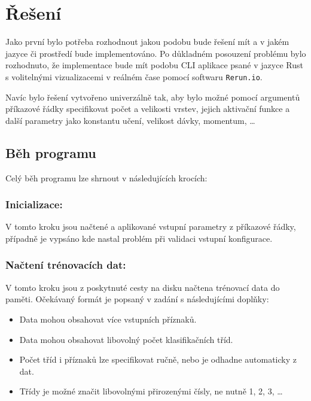 \section{Řešení}

Jako první bylo potřeba rozhodnout jakou podobu bude řešení mít a v jakém jazyce či prostředí bude implementováno.
Po důkladném posouzení problému bylo rozhodnuto, že implementace bude mít podobu CLI aplikace psané v jazyce Rust s volitelnými vizualizacemi v reálném čase pomocí softwaru \texttt{Rerun.io}.

Navíc bylo řešení vytvořeno univerzálně tak, aby bylo možné pomocí argumentů příkazové řádky specifikovat počet a velikosti vrstev, jejich aktivační funkce a další parametry jako konstantu učení, velikost dávky, momentum, \ldots

\subsection{Běh programu}
Celý běh programu lze shrnout v následujících krocích:
\subsubsection*{Inicializace:}
V tomto kroku jsou načtené a aplikované vstupní parametry z příkazové řádky, případně je vypsáno kde nastal problém při validaci vstupní konfigurace.
\subsubsection*{Načtení trénovacích dat:}
V tomto kroku jsou z poskytnuté cesty na disku načtena trénovací data do paměti.
Očekávaný formát je popsaný v zadání s následujícími doplňky:
\begin{itemize}
	\item Data mohou obsahovat více vstupních příznaků.
	\item Data mohou obsahovat libovolný počet klasifikačních tříd.
	\item Počet tříd i příznaků lze specifikovat ručně, nebo je odhadne automaticky z dat.
	\item Třídy je možné značit libovolnými přirozenými čísly, ne nutně 1, 2, 3, \ldots
\end{itemize}
